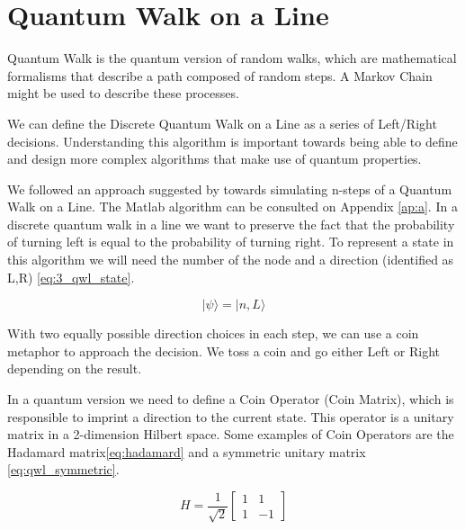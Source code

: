 
\section{Quantum Walk on a Line}
\label{sec:quantum_walk_line}

Quantum Walk is the quantum version of random walks, which are mathematical formalisms that describe a path composed of random steps. A Markov Chain might be used to describe these processes.

We can define the Discrete Quantum Walk on a Line as a series of Left/Right decisions. Understanding this algorithm is important towards being able to define and design more complex algorithms that make use of quantum properties.

 

We followed an approach suggested by \cite{Ambainis} towards simulating n-steps of a Quantum Walk on a Line. The Matlab algorithm can be consulted on Appendix \ref{ap:a}.
In a discrete quantum walk in a line we want to preserve the fact that the probability of turning left is equal to the probability of turning right.  To represent a state in this algorithm we will need the number of the node and a direction (identified as L,R) \ref{eq:3_qwl_state}.


\begin{equation}
\label{eq:3_qwl_state}
\vert \psi\rangle = \vert n, L\rangle
\end{equation}

With two equally possible direction choices in each step, we can use a coin metaphor\cite{Ambainis}\cite{Ambainis2008} to approach the decision. We toss a coin and go either Left or Right depending on the result. 

In a quantum version we need to define a Coin Operator (Coin Matrix), which is responsible to imprint a direction to the current state. This operator is a unitary matrix in a 2-dimension Hilbert space. Some examples of Coin Operators are the Hadamard matrix\ref{eq:hadamard} and a symmetric unitary matrix \ref{eq:qwl_symmetric}.

\begin{equation}
\label{eq:hadamard}
H=\frac{1}{\sqrt{2}}\left[\begin{array}{cc}
1 & 1\\
1 & -1
\end{array}\right]
\end{equation}

